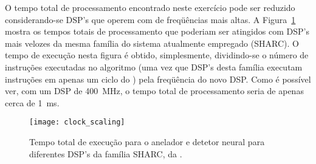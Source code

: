 O tempo total de processamento encontrado neste exercício pode ser reduzido
considerando-se DSP's que operem com  de freqüências mais altas. A
Figura~\ref{fig:dsp-clock-time} mostra os tempos totais de processamento que
poderiam ser atingidos com DSP's mais velozes da mesma família do sistema
atualmente empregado (SHARC). O tempo de execução nesta figura é obtido,
simplesmente, dividindo-se o número de instruções executadas no algoritmo (uma
vez que DSP's desta família executam instruções em apenas um ciclo do
) pela freqüência do novo DSP. Como é possível ver, com um DSP de
400~MHz, o tempo total de processamento seria de apenas cerca de 1~ms.

\begin{figure}
\begin{center}
\texttt{[image: clock\_scaling]}
\caption{Tempo total de execução para o anelador e detetor neural para
diferentes DSP's da família SHARC, da .}
\label{fig:dsp-clock-time}
\end{center}
\end{figure}

